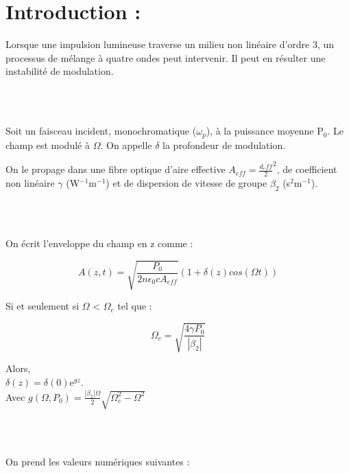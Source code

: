 \documentclass[a4paper,12pt,titlepage]{article}
\begin{document}
    
    \section{Introduction :}
        Lorsque une impulsion lumineuse traverse un milieu non linéaire d'ordre 3, un processus de mélange à quatre ondes peut intervenir. Il peut en résulter une instabilité de modulation. 
        
        ~\\~
        
        Soit un faisceau incident, monochromatique ($\omega_{p}$), à la puissance moyenne P$_0$. Le champ est modulé à $\Omega$. On appelle $\delta$ la profondeur de modulation. 
        
        On le propage dans une fibre optique d'aire effective $A_{eff} = \frac{d_eff}{2}^2$, de coefficient non linéaire $\gamma$ (W$^{-1}$m$^{-1}$) et de dispersion de vitesse de groupe $\beta_2$ (s$^2$m$^{-1}$).
        
        ~\\~
        
        On écrit l'enveloppe du champ en z comme :
        
        \begin{equation}
        A(z,t) = \sqrt{\frac{P_{0}}{2n\epsilon_0cA_{eff}}}(1+\delta(z) cos(\Omega t))
        \end{equation}
        
        Si et seulement si $\Omega$ < $\Omega_c$ tel que : 
        
        \begin{equation*}
            \Omega_c = \sqrt{\frac{4\gamma P_0}{|\beta_2|}}
        \end{equation*}
        
        Alors, \\
        {\centering $\delta(z) = \delta(0) \text{e}^{gz}$.\\}
        Avec $g(\Omega,P_0) = \frac{|\beta_2|\Omega}{2}\sqrt{\Omega_c^2 - \Omega^2}$
        
        
        ~\\~
        
        On prend les valeurs numériques suivantes :
        
\end{document}

